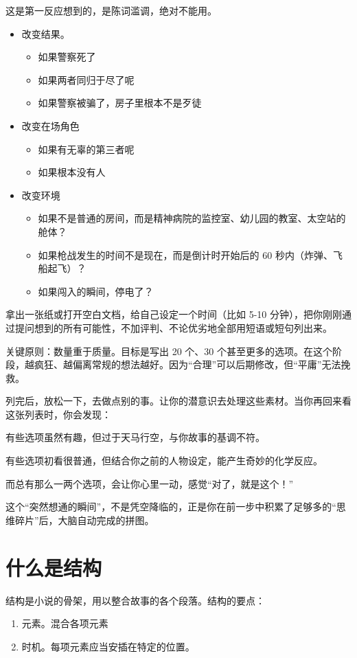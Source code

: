 \documentclass[11pt, twoside, hidelinks]{memoir}
\begin{document}
这是第一反应想到的，是陈词滥调，绝对不能用。
\begin{itemize}
\item 改变结果。
\begin{itemize}
\item 如果警察死了
\item 如果两者同归于尽了呢
\item 如果警察被骗了，房子里根本不是歹徒
\end{itemize}
\item 改变在场角色
\begin{itemize}
\item 如果有无辜的第三者呢
\item 如果根本没有人
\end{itemize}
\item 改变环境
\begin{itemize}
\item 如果不是普通的房间，而是精神病院的监控室、幼儿园的教室、太空站的舱体？
\item 如果枪战发生的时间不是现在，而是倒计时开始后的 60 秒内（炸弹、飞船起飞）？
\item 如果闯入的瞬间，停电了？
\end{itemize}
\end{itemize}


拿出一张纸或打开空白文档，给自己设定一个时间（比如 5-10 分钟），把你刚刚通过提问想到的所有可能性，不加评判、不论优劣地全部用短语或短句列出来。

关键原则：数量重于质量。目标是写出 20 个、30 个甚至更多的选项。在这个阶段，越疯狂、越偏离常规的想法越好。因为“合理”可以后期修改，但“平庸”无法挽救。

列完后，放松一下，去做点别的事。让你的潜意识去处理这些素材。当你再回来看这张列表时，你会发现：

有些选项虽然有趣，但过于天马行空，与你故事的基调不符。

有些选项初看很普通，但结合你之前的人物设定，能产生奇妙的化学反应。

而总有那么一两个选项，会让你心里一动，感觉“对了，就是这个！”

这个“突然想通的瞬间”，不是凭空降临的，正是你在前一步中积累了足够多的“思维碎片”后，大脑自动完成的拼图。
\chapter{什么是结构}
\label{What is plot structure}
结构是小说的骨架，用以整合故事的各个段落。结构的要点：
\begin{enumerate}
\item 元素。混合各项元素
\item 时机。每项元素应当安插在特定的位置。
\end{enumerate}
\end{document}
